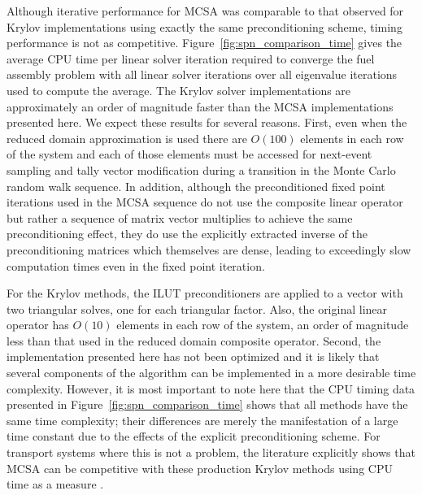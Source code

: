 Although iterative performance for MCSA was comparable to that
observed for Krylov implementations using exactly the same
preconditioning scheme, timing performance is not as
competitive. Figure~\ref{fig:spn_comparison_time} gives the average
CPU time per linear solver iteration required to converge the fuel
assembly problem with all linear solver iterations over all eigenvalue
iterations used to compute the average. The Krylov solver
implementations are approximately an order of magnitude faster than
the MCSA implementations presented here. We expect these results for
several reasons. First, even when the reduced domain approximation is
used there are $O(100)$ elements in each row of the system and each of
those elements must be accessed for next-event sampling and tally
vector modification during a transition in the Monte Carlo random walk
sequence. In addition, although the preconditioned fixed point
iterations used in the MCSA sequence do not use the composite linear
operator but rather a sequence of matrix vector multiplies to achieve
the same preconditioning effect, they do use the explicitly extracted
inverse of the preconditioning matrices which themselves are dense,
leading to exceedingly slow computation times even in the fixed point
iteration.

For the Krylov methods, the ILUT preconditioners are applied to a
vector with two triangular solves, one for each triangular
factor. Also, the original linear operator has $O(10)$ elements in
each row of the system, an order of magnitude less than that used in
the reduced domain composite operator. Second, the implementation
presented here has not been optimized and it is likely that several
components of the algorithm can be implemented in a more desirable
time complexity. However, it is most important to note here that the
CPU timing data presented in Figure~\ref{fig:spn_comparison_time}
shows that all methods have the same time complexity; their
differences are merely the manifestation of a large time constant due
to the effects of the explicit preconditioning scheme. For transport
systems where this is not a problem, the literature explicitly shows
that MCSA can be competitive with these production Krylov methods
using CPU time as a measure \cite{evans_monte_2012}.

